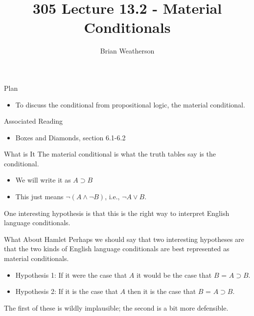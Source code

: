 \documentclass[
  ignorenonframetext,
]{beamer}
\title{305 Lecture 13.2 - Material Conditionals}
\author{Brian Weatherson}
\date{}
\providecommand{\tightlist}{%
  \setlength{\itemsep}{0pt}\setlength{\parskip}{0pt}}
\renewcommand{\,}{\text{, }}
\begin{document}
\frame{\titlepage}

\begin{frame}{Plan}
\protect\hypertarget{plan}{}
\begin{itemize}
\tightlist
\item
  To discuss the conditional from propositional logic, the material
  conditional.
\end{itemize}
\end{frame}

\begin{frame}{Associated Reading}
\protect\hypertarget{associated-reading}{}
\begin{itemize}
\tightlist
\item
  Boxes and Diamonds, section 6.1-6.2
\end{itemize}
\end{frame}

\begin{frame}{What is It}
\protect\hypertarget{what-is-it}{}
The material conditional is what the truth tables say is the
conditional.

\begin{itemize}
\tightlist
\item
  We will write it as \(A \supset B\)
\item
  This just means \(\neg (A \wedge \neg B)\), i.e., \(\neg A \vee B\).
\end{itemize}

One interesting hypothesis is that this is the right way to interpret
English language conditionals.
\end{frame}

\begin{frame}{What About Hamlet}
\protect\hypertarget{what-about-hamlet}{}
Perhaps we should say that two interesting hypotheses are that the two
kinds of English language conditionals are best represented as material
conditionals.

\begin{itemize}
\tightlist
\item
  Hypothesis 1: If it were the case that \(A\) it would be the case that
  \(B\) = \(A \supset B\).
\item
  Hypothesis 2: If it is the case that \(A\) then it is the case that
  \(B\) = \(A \supset B\).
\end{itemize}

The first of these is wildly implausible; the second is a bit more
defensible.
\end{frame}
\end{document}
